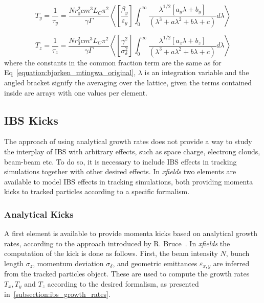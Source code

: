 \begin{equation}
    \boxed{T_y = \frac{1}{\tau_y} = \frac{N r_0^{2} c m^3 L_C \pi^2}{\gamma \Gamma} \left< \left[\frac{\beta_y}{\varepsilon_y}\right] \int_0^{\infty} \frac{\lambda^{1/2} \left[a_y \lambda + b_y\right]}{\left(\lambda^3 + a \lambda^2 + b \lambda + c\right)} d \lambda \right>}
    \label{equation:bm_ty}
\end{equation}

\begin{equation}
    \boxed{T_z = \frac{1}{\tau_z} = \frac{N r_0^{2} c m^3 L_C \pi^2}{\gamma \Gamma} \left< \left[\frac{\gamma^2}{\sigma_{\delta}^{2}}\right] \int_0^{\infty} \frac{\lambda^{1/2} \left[a_z \lambda + b_z\right]}{\left(\lambda^3 + a \lambda^2 + b \lambda + c\right)} d \lambda \right>}
    \label{equation:bm_tz}
\end{equation}
where the constants in the common fraction term are the same as for Eq~\eqref{equation:bjorken_mtingwa_original}, \(\lambda\) is an integration variable and the angled bracket signify the averaging over the lattice, given the terms contained inside are arrays with one values per element.

\subsection{IBS Kicks}
\label{subsection:ibs_kicks}

The approach of using analytical growth rates does not provide a way to study the interplay of IBS with arbitrary effects, such as space charge, electrong clouds, beam-beam etc.
To do so, it is necessary to include IBS effects in tracking simulations together with other desired effects.
In \textit{xfields} two elements are available to model IBS effects in tracking simulations, both providing momenta kicks to tracked particles according to a specific formalism.

\subsubsection{Analytical Kicks}

A first element is available to provide momenta kicks based on analytical growth rates, according to the approach introduced by R. Bruce~\cite{PRAB:Bruce:IBSAnalyticalKick}.
In \textit{xfields} the computation of the kick is done as follows.
First, the beam intensity \(N\), bunch length \(\sigma_z\), momentum deviation \(\sigma_{\delta}\), and geometric emittances \(\varepsilon_{x,y}\) are inferred from the tracked particles object.
These are used to compute the growth rates \(T_x, T_y\) and \(T_z\) according to the desired formalism, as presented in~\ref{subsection:ibs_growth_rates}.

